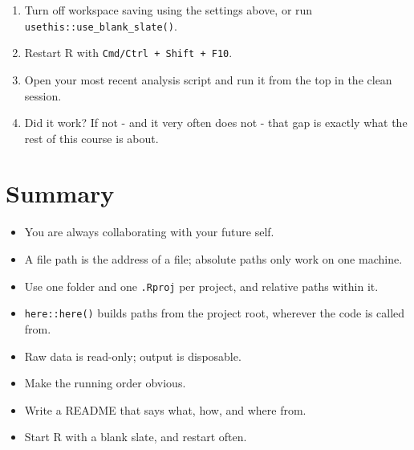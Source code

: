 \documentclass[
  letterpaper,
  justified,
  a4paper]{tufte-book}
\providecommand{\tightlist}{%
  \setlength{\itemsep}{0pt}\setlength{\parskip}{0pt}}
\providecommand{\tightlist}{%
  \setlength{\itemsep}{0pt}\setlength{\parskip}{0pt}}
\begin{document}
\begin{tcolorbox}[enhanced jigsaw, arc=.35mm, bottomrule=.15mm, bottomtitle=1mm, breakable, colback=white, colbacktitle=quarto-callout-note-color!10!white, colframe=quarto-callout-note-color-frame, coltitle=black, left=2mm, leftrule=.75mm, opacityback=0, opacitybacktitle=0.6, rightrule=.15mm, title=\textcolor{quarto-callout-note-color}{\faInfo}\hspace{0.5em}{Your Turn}, titlerule=0mm, toprule=.15mm, toptitle=1mm]

\begin{enumerate}
\def\labelenumi{\arabic{enumi}.}
\tightlist
\item
  Turn off workspace saving using the settings above, or run
  \texttt{usethis::use\_blank\_slate()}.
\item
  Restart R with \texttt{Cmd/Ctrl\ +\ Shift\ +\ F10}.
\item
  Open your most recent analysis script and run it from the top in the
  clean session.
\item
  Did it work? If not - and it very often does not - that gap is exactly
  what the rest of this course is about.
\end{enumerate}

\end{tcolorbox}

\section{Summary}\label{summary}

\begin{itemize}
\tightlist
\item
  You are always collaborating with your future self.
\item
  A file path is the address of a file; absolute paths only work on one
  machine.
\item
  Use one folder and one \texttt{.Rproj} per project, and relative paths
  within it.
\item
  \texttt{here::here()} builds paths from the project root, wherever the
  code is called from.
\item
  Raw data is read-only; output is disposable.
\item
  Make the running order obvious.
\item
  Write a README that says what, how, and where from.
\item
  Start R with a blank slate, and restart often.
\end{itemize}
\end{document}
